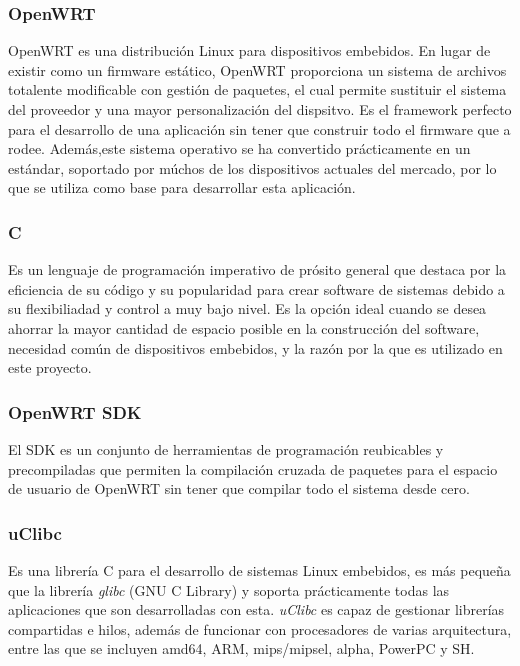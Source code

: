 \documentclass[12pt]{article}
\begin{document}
        \subsubsection{OpenWRT}
            OpenWRT es una distribución Linux para dispositivos embebidos. En lugar de existir como un firmware estático, OpenWRT proporciona un sistema de archivos totalente modificable con gestión de paquetes, el cual permite sustituir el sistema del proveedor y una mayor personalización del dispsitvo. Es el framework perfecto para el desarrollo de una aplicación sin tener que construir todo el firmware que a rodee. Además,este sistema operativo se ha convertido prácticamente en un estándar, soportado por múchos de los dispositivos actuales del mercado, por lo que se utiliza como base para desarrollar esta aplicación.

        \subsubsection{C}
            Es un lenguaje de programación imperativo de prósito general que destaca por la eficiencia de su código y su popularidad para crear software de sistemas debido a su flexibiliadad y control a muy bajo nivel. Es la opción ideal cuando se desea ahorrar la mayor cantidad de espacio posible en la construcción del software, necesidad común de dispositivos embebidos, y la razón por la que es utilizado en este proyecto.

            \subsubsection{OpenWRT SDK}
                El SDK es un conjunto de herramientas de programación reubicables y precompiladas que permiten la compilación cruzada de paquetes para el espacio de usuario de OpenWRT sin tener que compilar todo el sistema desde cero.

            \subsubsection{uClibc}
                Es una librería C para el desarrollo de sistemas Linux embebidos, es más pequeña que la librería \textit{glibc} (GNU C Library) y soporta prácticamente todas las aplicaciones que son desarrolladas con esta. \textit{uClibc} es capaz de gestionar librerías compartidas e hilos, además de funcionar con procesadores de varias arquitectura, entre las que se incluyen amd64, ARM, mips/mipsel, alpha, PowerPC y SH.
\end{document}

